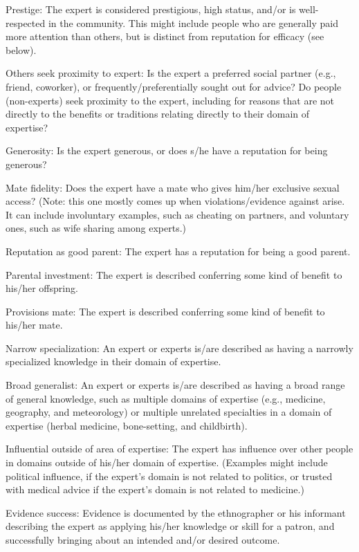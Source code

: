 \documentclass[
]{article}
\begin{document}
Prestige: The expert is considered prestigious, high status, and/or is well-respected in the community. This might include people who are generally paid more attention than others, but is distinct from reputation for efficacy (see below).

Others seek proximity to expert: Is the expert a preferred social partner (e.g., friend, coworker), or frequently/preferentially sought out for advice? Do people (non-experts) seek proximity to the expert, including for reasons that are not directly to the benefits or traditions relating directly to their domain of expertise?

Generosity: Is the expert generous, or does s/he have a reputation for being generous?

Mate fidelity: Does the expert have a mate who gives him/her exclusive sexual access? (Note: this one mostly comes up when violations/evidence against arise. It can include involuntary examples, such as cheating on partners, and voluntary ones, such as wife sharing among experts.)

Reputation as good parent: The expert has a reputation for being a good parent.

Parental investment: The expert is described conferring some kind of benefit to his/her offspring.

Provisions mate: The expert is described conferring some kind of benefit to his/her mate.

Narrow specialization: An expert or experts is/are described as having a narrowly specialized knowledge in their domain of expertise.

Broad generalist: An expert or experts is/are described as having a broad range of general knowledge, such as multiple domains of expertise (e.g., medicine, geography, and meteorology) or multiple unrelated specialties in a domain of expertise (herbal medicine, bone-setting, and childbirth).

Influential outside of area of expertise: The expert has influence over other people in domains outside of his/her domain of expertise. (Examples might include political influence, if the expert's domain is not related to politics, or trusted with medical advice if the expert's domain is not related to medicine.)

Evidence success: Evidence is documented by the ethnographer or his informant describing the expert as applying his/her knowledge or skill for a patron, and successfully bringing about an intended and/or desired outcome.
\end{document}

